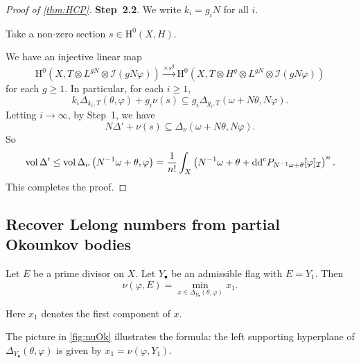 \begin{proof}[Proof of \cref{thm:HCP}]
    \textbf{Step~2.2}. We write $k_i=g_i N$ for all $i$.

    Take a non-zero section $s\in \mathrm{H}^0(X,H)$.

    We have an injective linear map
    \[
        \mathrm{H}^0\left(X,T\otimes L^{gN}\otimes \mathcal{I}(gN\varphi)\right)\xrightarrow{\times s^g}\mathrm{H}^0\left(X,T\otimes H^g\otimes L^{gN}\otimes \mathcal{I}(gN\varphi)\right)
    \]
    for each $g\geq 1$.
    In particular, for each $i\geq 1$,
    \[
        k_i\Delta_{k_i,T}(\theta,\varphi)+g_i\nu(s)\subseteq g_i\Delta_{g_i,T}\left(\omega+N\theta,N\varphi\right).
    \]
    Letting $i\to\infty$, by Step~1, we have
    \[
        N\Delta' + \nu(s) \subseteq \Delta_{\nu}(\omega+N\theta,N\varphi).
    \]
    So
    \[
        \operatorname{vol} \Delta'\leq \operatorname{vol} \Delta_{\nu}\left(N^{-1}\omega+\theta,\varphi\right)=\frac{1}{n!}\int_X \left(N^{-1}\omega+\theta+\mathrm{dd}^{\mathrm{c}} P_{N^{-1}\omega+\theta}[\varphi]_{\mathcal{I}}\right)^n.
    \]
    This completes the proof.
\end{proof}



\subsection{Recover Lelong numbers from partial Okounkov bodies}
\label{subsec:pob_lelong}



\begin{theorem}\label{thm:nuOk}
	Let $E$ be a prime divisor on $X$. Let $Y_{\bullet}$ be an admissible flag with $E=Y_1$. Then
	\begin{equation}\label{eq:numinOk}
		\nu(\varphi,E)=\min_{x\in \Delta_{Y_{\bullet}}(\theta,\varphi)}x_1.
	\end{equation}
\end{theorem}
Here $x_1$ denotes the first component of $x$.

The picture in \cref{fig:nuOk} illustrates the formula: the left supporting hyperplane of $\Delta_{Y_{\bullet}}(\theta,\varphi)$ is given by $x_1=\nu(\varphi,Y_1)$.

